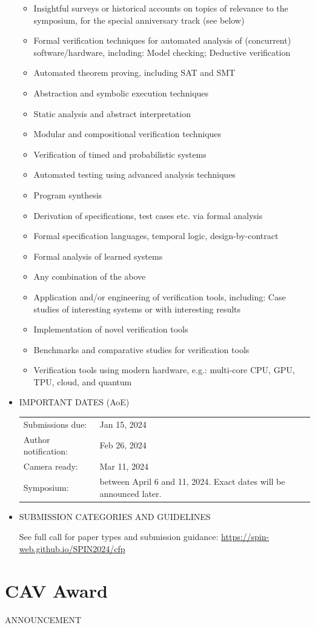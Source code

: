 \documentclass[prodmode,acmtecs]{acmsmall} %
\begin{document}
\begin{itemize}
\begin{itemize}\item  Insightful surveys or historical accounts on topics of relevance to the symposium, for the special anniversary track (see below)
\item  Formal verification techniques for automated analysis of (concurrent) software/hardware, including: Model checking; Deductive verification
\item  Automated theorem proving, including SAT and SMT
\item  Abstraction and symbolic execution techniques
\item  Static analysis and abstract interpretation
\item  Modular and compositional verification techniques
\item  Verification of timed and probabilistic systems
\item  Automated testing using advanced analysis techniques
\item  Program synthesis
\item  Derivation of specifications, test cases etc. via formal analysis
\item  Formal specification languages, temporal logic, design-by-contract
\item  Formal analysis of learned systems
\item  Any combination of the above
\item  Application and/or engineering of verification tools, including: Case studies of interesting systems or with interesting results
\item  Implementation of novel verification tools
\item  Benchmarks and comparative studies for verification tools
\item  Verification tools using modern hardware, e.g.: multi-core CPU, GPU, TPU, cloud, and quantum
\end{itemize} 
\item  IMPORTANT DATES (AoE) 
 
\begin{tabulary}{\linewidth}{LL}Submissions due:  & Jan 15, 2024 \\
Author notification:  & Feb 26, 2024 \\
Camera ready:  & Mar 11, 2024 \\
Symposium:  & between April 6 and 11, 2024. Exact dates will be announced later. \\
\end{tabulary}
 
\item  SUBMISSION CATEGORIES AND GUIDELINES 
 
  See full call for paper types and submission guidance: \href{https://spin-web.github.io/SPIN2024/cfp}{https://spin-web.github.io/SPIN2024/cfp} 
 
\end{itemize}\section{CAV Award}\label{CAVAward}ANNOUNCEMENT 
\end{document}
